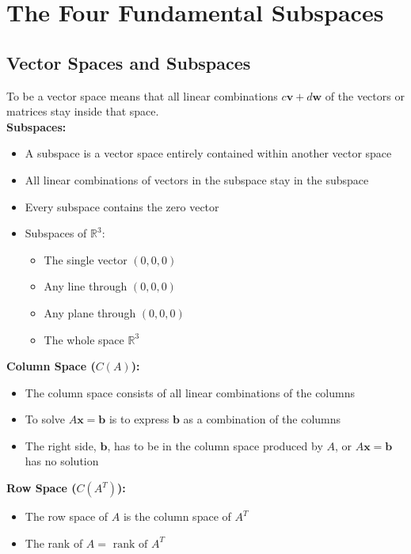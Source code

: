 \documentclass[11pt]{article}
\begin{document}
\section{The Four Fundamental Subspaces}
\subsection{Vector Spaces and Subspaces}

To be a vector space means that all linear combinations $c\boldsymbol{v} + d\boldsymbol{w}$ of 
the vectors or matrices stay inside that space. \\

\textbf{Subspaces:} 
\begin{itemize}
    \item A subspace is a vector space entirely contained within another vector space
    \item All linear combinations of vectors in the subspace stay in the subspace
    \item Every subspace contains the zero vector
    \item Subspaces of $\mathbb{R}^3$:
    \begin{itemize}
        \item The single vector $(0,0,0)$
        \item Any line through $(0,0,0)$
        \item Any plane through $(0,0,0)$
        \item The whole space $\mathbb{R}^3$
    \end{itemize}
\end{itemize} 

\textbf{Column Space ($C(A)$):}
\begin{itemize}
    \item The column space consists of all linear combinations of the columns
    \item To solve $A\boldsymbol{x} = \boldsymbol{b}$ is to express $\boldsymbol{b}$ as a
    combination of the columns
    \item The right side, $\boldsymbol{b}$, has to be in the column space produced by $A$, or 
    $A\boldsymbol{x} = \boldsymbol{b}$ has no solution
\end{itemize}

\textbf{Row Space ($C(A^T)$):}
\begin{itemize}
    \item The row space of $A$ is the column space of $A^T$
    \item The rank of $A = \text{ rank of } A^T$
\end{itemize}
\end{document}
